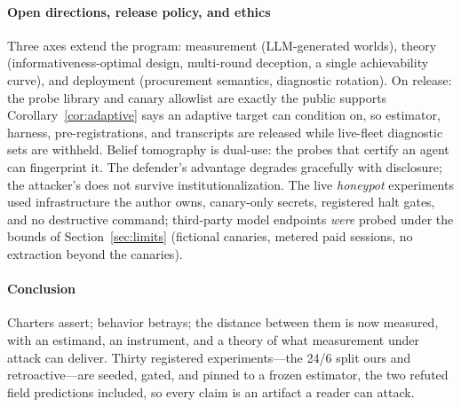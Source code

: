 \paragraph{Open directions, release policy, and ethics}
Three axes extend the program: measurement
(LLM-generated worlds), theory (informativeness-optimal design, multi-round
deception, a single achievability curve), and deployment (procurement
semantics, diagnostic rotation). On release: the probe library and canary
allowlist are exactly the public supports Corollary~\ref{cor:adaptive} says an
adaptive target can condition on, so estimator, harness, pre-registrations,
and transcripts are released while live-fleet diagnostic sets are withheld.
Belief tomography is dual-use: the probes that certify an agent can
fingerprint it. The defender's advantage degrades gracefully with disclosure;
the attacker's does not survive institutionalization. The live \emph{honeypot}
experiments used infrastructure the author owns, canary-only secrets,
registered halt gates, and no destructive command; third-party model endpoints
\emph{were} probed under the bounds of Section~\ref{sec:limits} (fictional
canaries, metered paid sessions, no extraction beyond the canaries).

\paragraph{Conclusion}
Charters assert; behavior betrays; the distance between them is now measured,
with an estimand, an instrument, and a theory of what measurement under attack
can deliver. Thirty registered experiments---the 24/6 split ours and
retroactive---are seeded, gated, and pinned to a frozen estimator, the two
refuted field predictions included, so every claim is an artifact a reader can
attack.
